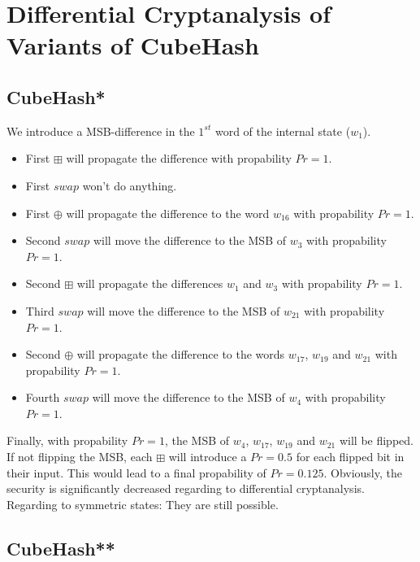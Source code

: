 

\renewcommand\thesubsection{\alph{subsection})}





\section{Differential Cryptanalysis of Variants of CubeHash}

\subsection{CubeHash*}

We introduce a MSB-difference in the $1^{st}$ word of the internal state ($w_1$).

\begin{itemize}
    \item First $\boxplus$ will propagate the difference with propability $Pr = 1$.
    \item First $swap$ won't do anything.
    \item First $\oplus$ will propagate the difference to the word $w_{16}$ with propability $Pr = 1$.
    \item Second $swap$ will move the difference to the MSB of $w_3$ with propability $Pr = 1$.
    \item Second $\boxplus$ will propagate the differences $w_1$ and $w_3$ with propability $Pr = 1$.
    \item Third $swap$ will move the difference to the MSB of $w_21$ with propability $Pr = 1$.
    \item Second $\oplus$ will propagate the difference to the words $w_{17}$, $w_{19}$ and $w_{21}$ with propability $Pr = 1$.
    \item Fourth $swap$ will move the difference to the MSB of $w_4$ with propability $Pr = 1$.
\end{itemize}

Finally, with propability $Pr = 1$, the MSB of $w_4$, $w_{17}$, $w_{19}$ and $w_{21}$ will be flipped. If not flipping the MSB, each $\boxplus$ will introduce a $Pr = 0.5$ for each flipped bit in their input. This would lead to a final propability of $Pr = 0.125$. Obviously, the security is significantly decreased regarding to differential cryptanalysis. Regarding to symmetric states: They are still possible.

\subsection{CubeHash**}

